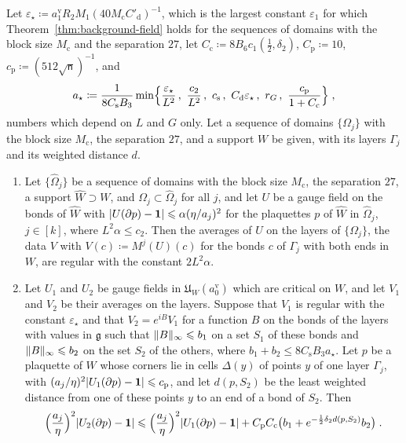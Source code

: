 \documentclass[11pt]{preprint}
\newcommand{\id}{\mathbf 1}
\DeclarePairedDelimiter{\abs}{\lvert}{\rvert}
\DeclarePairedDelimiter{\norm}{\lVert}{\rVert}
\numberwithin{equation}{section}
\begin{document}
\begin{lemma}\label{lem:two-minimisers}
Let $\varepsilon_\star \coloneqq a^{\mathrm v}_1R_2M_1(40M_{\mathrm c}C'_{\mathrm d})^{-1}$, which is the largest constant $\varepsilon_1$ for which Theorem~\ref{thm:background-field} holds for the sequences of domains with the block size $M_{\mathrm c}$ and the separation $27$, let $C_{\mathrm c} \coloneqq 8B_6c_1(\frac{1}{2}, \delta_2)$, $C_{\mathrm p} \coloneqq 10$, $c_{\mathrm p} \coloneqq (512\sqrt{\mathsf n})^{-1}$, and
\begin{equation}\label{eq:a-star}
    a_\star \coloneqq \frac{1}{8C_{\mathrm s}B_3}\min\Bigl\{ \frac{\varepsilon_\star}{L^2}\,,\ \frac{c_2}{L^2}\,,\ c_{\mathrm s}\,,\ C_{\mathrm d}\varepsilon_\star\,,\ r_G\,,\ \frac{c_{\mathrm p}}{1 + C_{\mathrm c}} \Bigr\}\;,
\end{equation}
numbers which depend on $L$ and $G$ only. Let a sequence of domains $\{ \Omega_j \}$ with the block size $M_{\mathrm c}$, the separation $27$, and a support $W$ be given, with its layers $\Gamma_j$ and its weighted distance $d$.
\begin{enumerate}[label=(\roman*)]
\item Let $\{ \hat\Omega_j \}$ be a sequence of domains with the block size $M_{\mathrm c}$, the separation $27$, a support $\hat W \supset W$, and $\Omega_j \subset \hat\Omega_j$ for all $j$, and let $U$ be a gauge field on the bonds of $\hat W$ with $\abs{U(\partial p) - \id} \leqslant \alpha(\eta/a_j)^2$ for the plaquettes $p$ of $\hat W$ in $\hat\Omega_j$, $j \in [k]$, where $L^2\alpha \leqslant c_2$. Then the averages of $U$ on the layers of $\{ \Omega_j \}$, the data $V$ with $V(c) \coloneqq M^j(U)(c)$ for the bonds $c$ of $\Gamma_j$ with both ends in $W$, are regular with the constant $2L^2\alpha$.
\item Let $U_1$ and $U_2$ be gauge fields in $\mathfrak U_W(a^{\mathrm v}_0)$ which are critical on $W$, and let $V_1$ and $V_2$ be their averages on the layers. Suppose that $V_1$ is regular with the constant $\varepsilon_\star$ and that $V_2 = e^{iB}V_1$ for a function $B$ on the bonds of the layers with values in $\mathfrak g$ such that $\norm B_\infty \leqslant b_1$ on a set $S_1$ of these bonds and $\norm B_\infty \leqslant b_2$ on the set $S_2$ of the others, where $b_1 + b_2 \leqslant 8C_{\mathrm s}B_3a_\star$. Let $p$ be a plaquette of $W$ whose corners lie in cells $\Delta(y)$ of points $y$ of one layer $\Gamma_j$, with $(a_j/\eta)^2\abs{U_1(\partial p) - \id} \leqslant c_{\mathrm p}$, and let $d(p, S_2)$ be the least weighted distance from one of these points $y$ to an end of a bond of $S_2$. Then
\begin{equation}\label{eq:two-minimisers}
    \Bigl(\frac{a_j}{\eta}\Bigr)^2\abs{U_2(\partial p) - \id} \leqslant \Bigl(\frac{a_j}{\eta}\Bigr)^2\abs{U_1(\partial p) - \id} + C_{\mathrm p}C_{\mathrm c}\bigl(b_1 + e^{-\frac{1}{2}\delta_2d(p, S_2)}b_2\bigr)\;.
\end{equation}
\end{enumerate}
\end{lemma}
\end{document}
